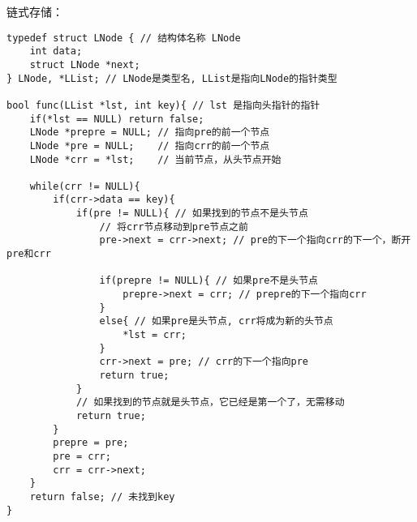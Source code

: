 \documentclass{ctexart}
\begin{document}
链式存储：
\begin{lstlisting}
typedef struct LNode { // 结构体名称 LNode
    int data;
    struct LNode *next;
} LNode, *LList; // LNode是类型名, LList是指向LNode的指针类型

bool func(LList *lst, int key){ // lst 是指向头指针的指针
    if(*lst == NULL) return false;
    LNode *prepre = NULL; // 指向pre的前一个节点
    LNode *pre = NULL;    // 指向crr的前一个节点
    LNode *crr = *lst;    // 当前节点，从头节点开始

    while(crr != NULL){
        if(crr->data == key){
            if(pre != NULL){ // 如果找到的节点不是头节点
                // 将crr节点移动到pre节点之前
                pre->next = crr->next; // pre的下一个指向crr的下一个，断开pre和crr
                
                if(prepre != NULL){ // 如果pre不是头节点
                    prepre->next = crr; // prepre的下一个指向crr
                }
                else{ // 如果pre是头节点, crr将成为新的头节点
                    *lst = crr;
                }
                crr->next = pre; // crr的下一个指向pre
                return true;
            }
            // 如果找到的节点就是头节点，它已经是第一个了，无需移动
            return true; 
        }
        prepre = pre;
        pre = crr;
        crr = crr->next;
    }
    return false; // 未找到key
}
\end{lstlisting}
\end{document}
